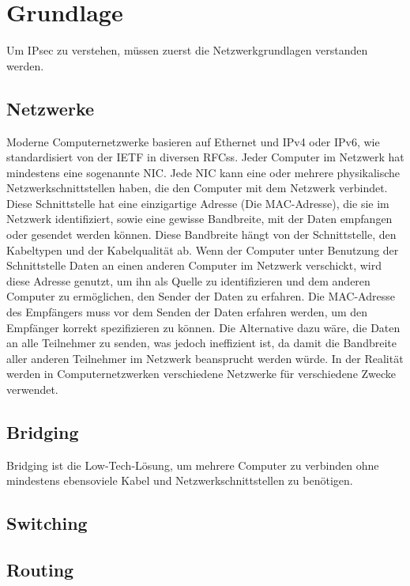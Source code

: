 \section{Grundlage}
Um IPsec zu verstehen, müssen zuerst die Netzwerkgrundlagen verstanden werden.
\subsection{Netzwerke}
Moderne Computernetzwerke basieren auf Ethernet und \ac{IPv4} oder \ac{IPv6}, wie standardisiert
von der \ac{IETF} in diversen \acp{RFCs}.
Jeder Computer im Netzwerk hat mindestens eine sogenannte \ac{NIC}.
Jede \ac{NIC} kann eine oder mehrere physikalische Netzwerkschnittstellen haben,
die den Computer mit dem Netzwerk verbindet. Diese Schnittstelle hat eine einzigartige
Adresse (Die MAC-Adresse), die sie im Netzwerk identifiziert, sowie eine gewisse Bandbreite, mit
der Daten empfangen oder gesendet werden können. Diese Bandbreite hängt von der Schnittstelle, den Kabeltypen und der Kabelqualität ab.
Wenn der Computer unter Benutzung der Schnittstelle Daten an einen anderen Computer im Netzwerk verschickt, wird diese Adresse genutzt, um ihn als
Quelle zu identifizieren und dem anderen Computer zu ermöglichen, den Sender der Daten zu erfahren.
Die MAC-Adresse des Empfängers muss vor dem Senden der Daten erfahren werden, um den Empfänger korrekt spezifizieren zu können.
Die Alternative dazu wäre, die Daten an alle Teilnehmer zu senden, was jedoch ineffizient ist, da
damit die Bandbreite aller anderen Teilnehmer im Netzwerk beansprucht werden würde.
In der Realität werden in Computernetzwerken verschiedene Netzwerke für verschiedene Zwecke verwendet.
\subsection{Bridging}
Bridging ist die Low-Tech-Lösung, um mehrere Computer zu verbinden ohne mindestens ebensoviele
Kabel und Netzwerkschnittstellen zu benötigen.

\subsection{Switching}
\subsection{Routing}
